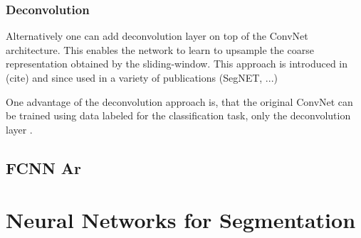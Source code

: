 \subsubsection{Deconvolution} Alternatively one can add deconvolution layer on top of the ConvNet architecture. This enables the network to learn to upsample the coarse representation obtained by the sliding-window. This approach is introduced in (cite) and since used in a variety of publications (SegNET, ...)

One advantage of the deconvolution approach is, that the original ConvNet can be trained using data labeled for the classification task, only the deconvolution layer .

\subsection{FCNN Ar}


\section{Neural Networks for Segmentation}


